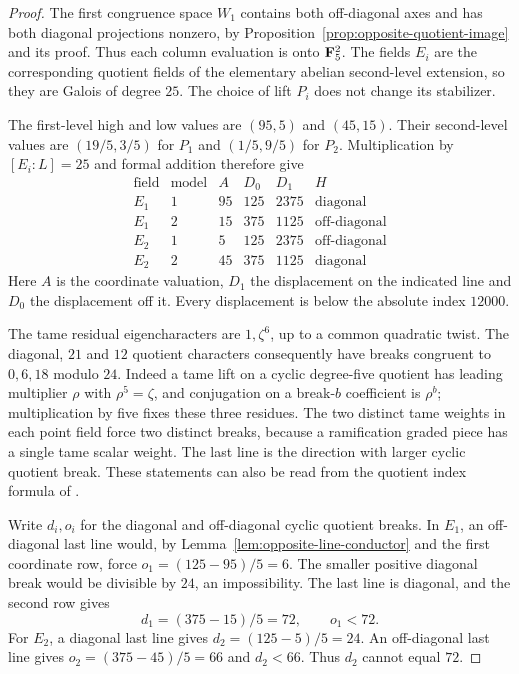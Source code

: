 \begin{proof}
The first congruence space $W_1$ contains both off-diagonal axes and has both diagonal projections nonzero, by Proposition~\ref{prop:opposite-quotient-image} and its proof. Thus each column evaluation is onto $\mathbf F_5^2$. The fields $E_i$ are the corresponding quotient fields of the elementary abelian second-level extension, so they are Galois of degree $25$. The choice of lift $P_i$ does not change its stabilizer.

The first-level high and low values are $(95,5)$ and $(45,15)$. Their second-level values are $(19/5,3/5)$ for $P_1$ and $(1/5,9/5)$ for $P_2$. Multiplication by $[E_i:L]=25$ and formal addition therefore give
\[
\begin{array}{c|c|r|r|r|c}
\text{field}&\text{model}&A&D_0&D_1&H\\\hline
E_1&1&95&125&2375&\text{diagonal}\\
E_1&2&15&375&1125&\text{off-diagonal}\\
E_2&1&5&125&2375&\text{off-diagonal}\\
E_2&2&45&375&1125&\text{diagonal}
\end{array}
\]
Here $A$ is the coordinate valuation, $D_1$ the displacement on the indicated line and $D_0$ the displacement off it. Every displacement is below the absolute index $12000$.

The tame residual eigencharacters are $1,\zeta^6$, up to a common quadratic twist. The diagonal, $21$ and $12$ quotient characters consequently have breaks congruent to $0,6,18$ modulo $24$. Indeed a tame lift on a cyclic degree-five quotient has leading multiplier $\rho$ with $\rho^5=\zeta$, and conjugation on a break-$b$ coefficient is $\rho^b$; multiplication by five fixes these three residues. The two distinct tame weights in each point field force two distinct breaks, because a ramification graded piece has a single tame scalar weight. The last line is the direction with larger cyclic quotient break. These statements can also be read from the quotient index formula of \citet[Proposition~3.7, pp.~14--15, and Proposition~3.13, p.~16]{ColmezLocal}.

Write $d_i,o_i$ for the diagonal and off-diagonal cyclic quotient breaks. In $E_1$, an off-diagonal last line would, by Lemma~\ref{lem:opposite-line-conductor} and the first coordinate row, force $o_1=(125-95)/5=6$. The smaller positive diagonal break would be divisible by $24$, an impossibility. The last line is diagonal, and the second row gives
\[
                         d_1=(375-15)/5=72,\qquad o_1<72.
\]
For $E_2$, a diagonal last line gives $d_2=(125-5)/5=24$. An off-diagonal last line gives $o_2=(375-45)/5=66$ and $d_2<66$. Thus $d_2$ cannot equal $72$.


\end{proof}
